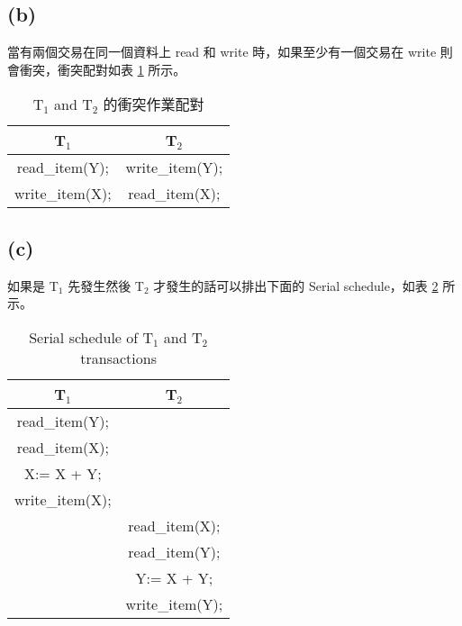 \documentclass{article}
\begin{document}
\subsection*{(b)}
當有兩個交易在同一個資料上 read 和 write 時，如果至少有一個交易在 write 則會衝突，衝突配對如表 \ref{tab:2_b} 所示。
\begin{table}[H]
    \centering
    \begin{tabular}{|cc|}
    \toprule
    \textbf{T$_1$} & \textbf{T$_2$} \\
    \midrule
    read\_item(Y); & write\_item(Y); \\
    \midrule
    write\_item(X); & read\_item(X); \\
    \bottomrule
    \end{tabular}
    \caption{T$_1$ and T$_2$ 的衝突作業配對}
    \label{tab:2_b}
\end{table}


\subsection*{(c)}
如果是 T$_1$ 先發生然後 T$_2$ 才發生的話可以排出下面的 Serial schedule，如表 \ref{tab:2_c} 所示。
\begin{table}[H]
    \centering
    \begin{tabular}{|c|c|}
    \toprule
    \textbf{T$_1$} & \textbf{T$_2$} \\
    \midrule
    read\_item(Y); &  \\
    read\_item(X); &  \\
    X:= X + Y; &  \\
    write\_item(X); &  \\
     & read\_item(X); \\
     & read\_item(Y); \\
     & Y:= X + Y; \\
     & write\_item(Y); \\
    \bottomrule
    \end{tabular}
    \caption{Serial schedule of T$_1$ and T$_2$ transactions}
    \label{tab:2_c}
\end{table}
\end{document}
